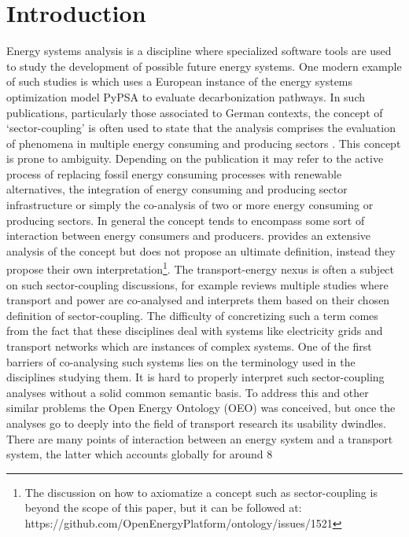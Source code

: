 ﻿\section{Introduction}
\label{introduction}
Energy systems analysis is a discipline where specialized software tools are
used to study the development of possible future energy systems. One modern
example of such studies is \cite{Victoria.2022} which uses a European instance
of the energy systems optimization model PyPSA \cite{Brown.2018} to evaluate
decarbonization pathways. In such publications, particularly those associated to
German contexts, the concept of `sector-coupling' is often used to state that
the analysis comprises the evaluation of phenomena in multiple energy consuming
and producing sectors \cite{Fridgen.2020}. This concept is prone to ambiguity.
Depending on the publication it may refer to the active process of replacing
fossil energy consuming processes with renewable alternatives, the integration
of energy consuming and producing sector infrastructure or simply the
co-analysis of two or more energy consuming or producing sectors. In general the
concept tends to encompass some sort of interaction between energy consumers and
producers. \cite{Ramsebner.2021} provides an extensive analysis of the concept
but does not propose an ultimate definition, instead they propose their own
interpretation\footnote{The discussion on how to axiomatize a concept such as
sector-coupling is beyond the scope of this paper, but it can be followed at:
https://github.com/OpenEnergyPlatform/ontology/issues/1521}. The
transport-energy nexus is often a subject on such sector-coupling discussions,
for example \cite{Robinius.2017} reviews multiple studies where transport and
power are co-analysed and interprets them based on their chosen definition of
sector-coupling. The difficulty of concretizing such a term comes from the fact
that these disciplines deal with systems like electricity grids and transport
networks which are instances of complex systems. One of the first barriers of
co-analysing  such systems lies on the terminology used in the disciplines
studying them. It is hard to properly interpret such sector-coupling analyses
without a solid common semantic basis. To address this and other similar
problems the Open Energy Ontology (OEO) \cite{Booshehri.2021} was conceived, but
once the analyses go to deeply into the field of transport research its
usability dwindles. There are many points of interaction between an energy
system and a transport system, the latter which accounts globally for around 8
